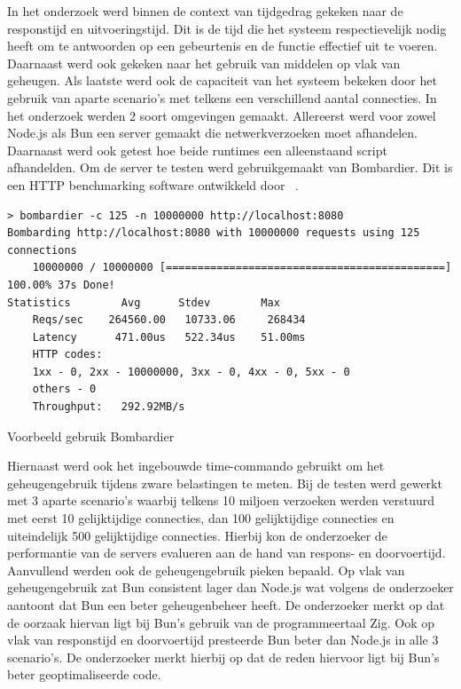 In het onderzoek werd binnen de context van tijdgedrag gekeken naar de responstijd en uitvoeringstijd. 
Dit is de tijd die het systeem respectievelijk nodig heeft om te antwoorden op een gebeurtenis en de functie effectief uit te voeren.
Daarnaast werd ook gekeken naar het gebruik van middelen op vlak van geheugen.
Als laatste werd ook de capaciteit van het systeem bekeken door het gebruik van aparte scenario's met telkens een verschillend aantal connecties.
In het onderzoek werden 2 soort omgevingen gemaakt. Allereerst werd voor zowel Node.js als Bun een server gemaakt die netwerkverzoeken moet afhandelen.
Daarnaast werd ook getest hoe beide runtimes een alleenstaand script afhandelden.
Om de server te testen werd gebruikgemaakt van Bombardier. Dit is een HTTP benchmarking software ontwikkeld door ~\textcite{Fedoseev2023}.
\begin{listing}[H]
    \centering
    \begin{verbatim}
> bombardier -c 125 -n 10000000 http://localhost:8080
Bombarding http://localhost:8080 with 10000000 requests using 125 connections
    10000000 / 10000000 [============================================] 100.00% 37s Done!
Statistics        Avg      Stdev        Max
    Reqs/sec    264560.00   10733.06     268434
    Latency      471.00us   522.34us    51.00ms
    HTTP codes:
    1xx - 0, 2xx - 10000000, 3xx - 0, 4xx - 0, 5xx - 0
    others - 0
    Throughput:   292.92MB/s
        \end{verbatim}
        \caption[Gebruik Bombardier]{Voorbeeld gebruik Bombardier \autocite{Fedoseev2023}}
\end{listing}
Hiernaast werd ook het ingebouwde time-commando gebruikt om het geheugengebruik tijdens zware belastingen te meten.
Bij de testen werd gewerkt met 3 aparte scenario's waarbij telkens 10 miljoen verzoeken werden verstuurd met eerst 10 gelijktijdige connecties, 
dan 100 gelijktijdige connecties en uiteindelijk 500 gelijktijdige connecties.
Hierbij kon de onderzoeker de performantie van de servers evalueren aan de hand van respons- en doorvoertijd. Aanvullend werden ook de geheugengebruik pieken bepaald.
Op vlak van geheugengebruik zat Bun consistent lager dan Node.js wat volgens de onderzoeker aantoont dat Bun een beter geheugenbeheer heeft. 
De onderzoeker merkt op dat de oorzaak hiervan ligt bij Bun's gebruik van de programmeertaal Zig. 
Ook op vlak van responstijd en doorvoertijd presteerde Bun beter dan Node.js in alle 3 scenario's.
De onderzoeker merkt hierbij op dat de reden hiervoor ligt bij Bun's beter geoptimaliseerde code.


